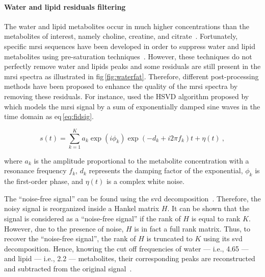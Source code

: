 \paragraph{Water and lipid residuals filtering} The water and lipid metabolites occur in much higher concentrations than the metabolites of interest, namely choline, creatine, and citrate~\cite{Zhu2010,Osorio-Garcia2012}.
Fortunately, specific \ac{mrsi} sequences have been developed in order to suppress water and lipid metabolites using pre-saturation techniques~\cite{Zhu2010}.
However, these techniques do not perfectly remove water and lipids peaks and some residuals are still present in the \ac{mrsi} spectra as illustrated in \ac{fig}\,\ref{fig:waterfat}.
Therefore, different post-processing methods have been proposed to enhance the quality of the \ac{mrsi} spectra by removing these residuals.
For instance, \citeauthor{Kelm2007} used the HSVD algorithm proposed by \citeauthor{Pijnappel1992} which models the \ac{mrsi} signal by a sum of exponentially damped sine waves in the time domain as \acs{eq}\,\eqref{eq:fidsig}.

\begin{equation}
	s(t) = \sum_{k=1}^{K} a_{k}\exp(i \phi_k) \exp( -d_{k} + i 2 \pi f_{k} ) t + \eta(t) \ ,
	\label{eq:fidsig}
\end{equation}

\noindent where $a_k$ is the amplitude proportional to the metabolite concentration with a resonance frequency $f_{k}$, $d_k$ represents the damping factor of the exponential, $\phi_k$ is the first-order phase, and $\eta(t)$ is a complex white noise.

The ``noise-free signal'' can be found using the \ac{svd} decomposition~\cite{Pijnappel1992}.
Therefore, the noisy signal is reorganized inside a Hankel matrix $H$.
It can be shown that the signal is considered as a ``noise-free signal'' if the rank of $H$ is equal to rank $K$.
However, due to the presence of noise, $H$ is in fact a full rank matrix.
Thus, to recover the ``noise-free signal'', the rank of $H$ is truncated to $K$ using its \ac{svd} decomposition.
Hence, knowing the cut off frequencies of water --- i.e., \SI{4.65}{\ppm} --- and lipid --- i.e., \SI{2.2}{\ppm} --- metabolites, their corresponding peaks are reconstructed and subtracted from the original signal~\cite{Laudadio2002}.
	
